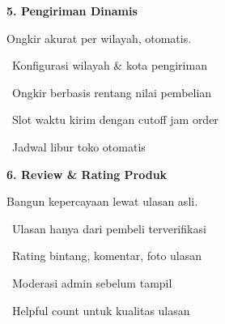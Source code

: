\documentclass[a4paper]{article}
\begin{document}
\vspace{8pt}

\noindent
\begin{minipage}[t]{0.485\textwidth}
    \colorbox{OrangePrimary}{%
        \begin{minipage}{\dimexpr\textwidth-2\fboxsep\relax}
            {\fontsize{10}{13}\selectfont\bfseries\color{White} 5. Pengiriman Dinamis}
        \end{minipage}}\par
    \vspace{4pt}
    {\fontsize{9}{12}\selectfont\color{TextDark}%
    Ongkir akurat per wilayah, otomatis.\par\vspace{3pt}
    \textbullet\ Konfigurasi wilayah \& kota pengiriman\par\vspace{2pt}%
    \textbullet\ Ongkir berbasis rentang nilai pembelian\par\vspace{2pt}%
    \textbullet\ Slot waktu kirim dengan cutoff jam order\par\vspace{2pt}%
    \textbullet\ Jadwal libur toko otomatis}%
\end{minipage}%
\hfill
\begin{minipage}[t]{0.485\textwidth}
    \colorbox{EmeraldDark}{%
        \begin{minipage}{\dimexpr\textwidth-2\fboxsep\relax}
            {\fontsize{10}{13}\selectfont\bfseries\color{White} 6. Review \& Rating Produk}
        \end{minipage}}\par
    \vspace{4pt}
    {\fontsize{9}{12}\selectfont\color{TextDark}%
    Bangun kepercayaan lewat ulasan asli.\par\vspace{3pt}
    \textbullet\ Ulasan hanya dari pembeli terverifikasi\par\vspace{2pt}%
    \textbullet\ Rating bintang, komentar, foto ulasan\par\vspace{2pt}%
    \textbullet\ Moderasi admin sebelum tampil\par\vspace{2pt}%
    \textbullet\ Helpful count untuk kualitas ulasan}%
\end{minipage}

\vspace{8pt}
\end{document}

